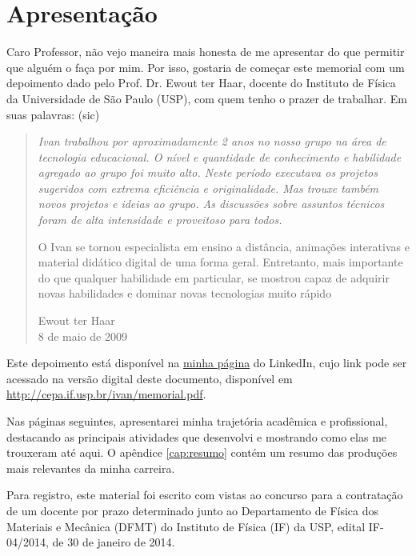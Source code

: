 \section{Apresentação}

Caro Professor, não vejo maneira mais honesta de me apresentar do que permitir que alguém o faça por mim. Por isso, gostaria de começar este memorial com um depoimento dado pelo Prof. Dr. Ewout ter Haar, docente do Instituto de Física da Universidade de São Paulo (USP), com quem tenho o prazer de trabalhar. Em suas palavras: (sic)

\begin{quotation}\small

{\itshape Ivan trabalhou por aproximadamente 2 anos no nosso grupo na área de tecnologia educacional. O nível e quantidade de conhecimento e habilidade agregado ao grupo foi muito alto. Neste período executava os projetos sugeridos com extrema eficiência e originalidade. Mas trouxe também novos projetos e ideias ao grupo. As discussões sobre assuntos técnicos foram de alta intensidade e proveitoso para todos. 

O Ivan se tornou especialista em ensino a distância, animações interativas e material didático digital de uma forma geral. Entretanto, mais importante do que qualquer habilidade em particular, se mostrou capaz de adquirir novas habilidades e dominar novas tecnologias muito rápido}

\begin{flushright}
Ewout ter Haar\\8 de maio de 2009
\end{flushright}

\end{quotation}

Este depoimento está disponível na \href{http://br.linkedin.com/in/irpagnossin}{minha página} do LinkedIn, cujo link pode ser acessado na versão digital deste documento, disponível em  \url{http://cepa.if.usp.br/ivan/memorial.pdf}.

Nas páginas seguintes, apresentarei minha trajetória acadêmica e profissional, destacando as principais atividades que desenvolvi e mostrando como elas me trouxeram até aqui. O apêndice \ref{cap:resumo} contém um resumo das produções mais relevantes da minha carreira.

Para registro, este material foi escrito com vistas ao concurso para a contratação de um docente por prazo determinado junto ao Departamento de Física dos Materiais e Mecânica (DFMT) do Instituto de Física (IF) da USP, edital IF-04/2014, de 30 de janeiro de 2014.

